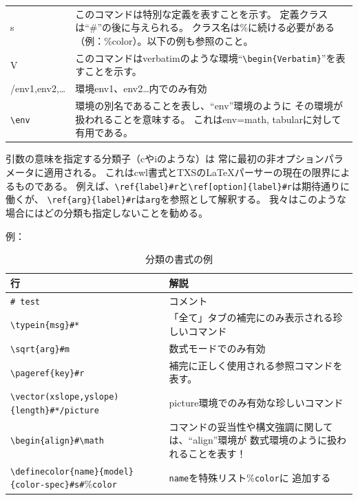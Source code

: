 \begin{table}[H]
\begin{tabularx}{\linewidth}{lX}
    s & このコマンドは特別な定義を表すことを示す。
       定義クラスは``\#''の後に与えられる。
       クラス名は\%に続ける必要がある（例：\%color）。以下の例も参照のこと。\\
    V & このコマンドはverbatimのような環境``\verb+\begin+\verb+{Verbatim}+''を表すことを示す。\\
    /env1,env2,\ldots{} & 環境env1、env2\ldots{}内でのみ有効\\
    \verb+\env+ & 環境の別名であることを表し、``env''環境のように
      その環境が扱われることを意味する。
      これはenv=math, tabularに対して有用である。\\
    \hline
  \end{tabularx}
\end{table}

引数の意味を指定する分類子（cやiのような）は
常に最初の非オプションパラメータに適用される。
これはcwl書式とTXSのLaTeXパーサーの現在の限界によるものである。
例えば、\verb+\ref{label}#r+と\verb+\ref[option]{label}#r+は期待通りに働くが、
\verb+\ref{arg}{label}#r+は\verb+arg+を参照として解釈する。
我々はこのような場合にはどの分類も指定しないことを勧める。

例：

\begin{table}[H]
  \centering
  \caption{分類の書式の例}
  \begin{tabularx}{\linewidth}{lX}
    \hline
    \textbf{行} & \textbf{解説}\\
    \hline
    \verb+# test+ & コメント\\
    \verb+\typein+\verb+{msg}#*+ & 「全て」タブの補完にのみ表示される珍しいコマンド\\
    \verb+\sqrt+\verb+{arg}#m+ & 数式モードでのみ有効\\
    \verb+\pageref+\verb+{key}#r+ & 補完に正しく使用される参照コマンドを表す。\\
    \verb+\vector+\verb+(xslope,yslope){length}#*/picture+
      & picture環境でのみ有効な珍しいコマンド\\
    \verb+\begin+\verb+{align}#\math+
      & コマンドの妥当性や構文強調に関しては、``align''環境が
      数式環境のように扱われることを表す！\\
    \verb+\definecolor+\verb+{name}{model}{color-spec}#s#+\%\verb+color+
      & \verb+name+を特殊リスト\%\verb+color+に
      追加する\\
    \hline
  \end{tabularx}
\end{table}

